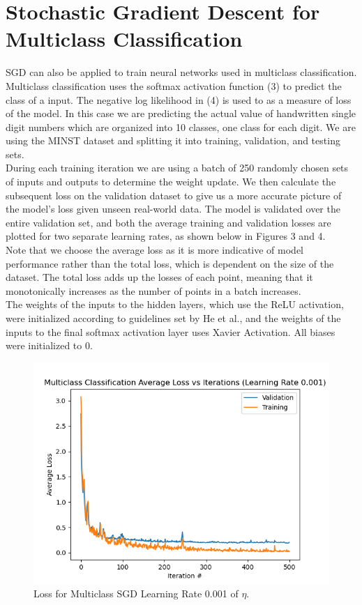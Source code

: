 \documentclass[11pt,letterpaper,titlepage]{article}
\begin{document}
	\section{Stochastic Gradient Descent for Multiclass Classification}
	SGD can also be applied to train neural networks used in multiclass classification. Multiclass classification uses the softmax activation function (3) to predict the class of a input. The negative log likelihood in (4) is used to as a measure of loss of the model. In this case we are predicting the actual value of handwritten single digit numbers which are organized into 10 classes, one class for each digit. We are using the MINST dataset and splitting it into training, validation, and testing sets.\\ During each training iteration we are using a batch of 250 randomly chosen sets of inputs and outputs to determine the weight update. We then calculate the subsequent loss on the validation dataset to give us a more accurate picture of the model's loss given unseen real-world data. The model is validated over the entire validation set, and both the average training and validation losses are plotted for two separate learning rates, as shown below in Figures 3 and 4. \\ Note that we choose the average loss as it is more indicative of model performance rather than the total loss, which is dependent on the size of the dataset. The total loss adds up the losses of each point, meaning that it monotonically increases as the number of points in a batch increases.\\ The weights of the inputs to the hidden layers, which use the ReLU activation, were initialized according to guidelines set by He et al., and the weights of the inputs to the final softmax activation layer uses Xavier Activation. All biases were initialized to 0.
	\begin{figure}[H]
		\includegraphics[width=\linewidth]{Multiclass Classification Average Loss vs Iterations (Learning Rate 0.001).png}
		\caption{Loss for Multiclass SGD Learning Rate 0.001 of $\eta$.}
		\label{fig: SGD Multi LR 0.001}
	\end{figure}
\end{document}
